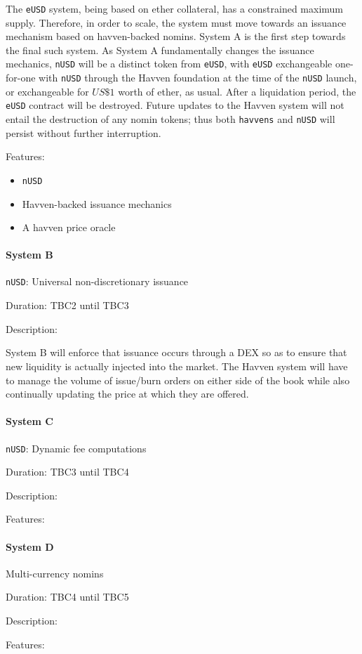 The \texttt{eUSD} system, being based on ether collateral, has a constrained maximum supply.
Therefore, in order to scale, the system must move towards an issuance mechanism based on havven-backed
nomins. System A is the first step towards the final such system. As System A fundamentally
changes the issuance mechanics, \texttt{nUSD} will be a distinct token from \texttt{eUSD},
with \texttt{eUSD} exchangeable one-for-one with \texttt{nUSD} through the Havven
foundation at the time of the \texttt{nUSD} launch, or exchangeable for \(US\$1\) worth of ether,
as usual. After a liquidation period, the \texttt{eUSD} contract will be destroyed.
Future updates to the Havven system will not entail the destruction of any nomin tokens; thus
both \texttt{havvens} and \texttt{nUSD} will persist without further interruption.

Features:
\begin{itemize}
    \item{\texttt{nUSD}}
    \item{Havven-backed issuance mechanics}
    \item{A havven price oracle}
\end{itemize}


\paragraph{System B} \texttt{nUSD}: Universal non-discretionary issuance

Duration: TBC2 until TBC3

Description:

System B will enforce that issuance occurs through a DEX so as to ensure that
new liquidity is actually injected into the market. The Havven system
will have to manage the volume of issue/burn orders on either side of the book
while also continually updating the price at which they are offered.


\paragraph{System C} \texttt{nUSD}: Dynamic fee computations

Duration: TBC3 until TBC4

Description:

Features:


\paragraph{System D} Multi-currency nomins

Duration: TBC4 until TBC5

Description:

Features:
